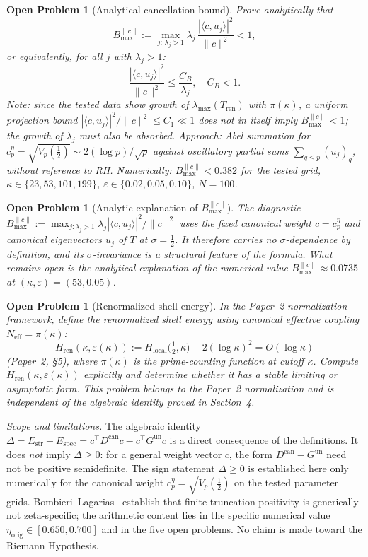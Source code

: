 \documentclass[11pt]{article}
\newtheorem{openproblem}[theorem]{Open Problem}
\newcommand{\etaorig}{\eta_{\mathrm{orig}}}
\newcommand{\Tren}{T_{\mathrm{ren}}}
\begin{document}
\begin{openproblem}[Analytical cancellation bound]\label{op:cancel}
Prove analytically that
\[
B^{\|c\|}_{\max} :=
\max_{j:\,\lambda_j>1}\lambda_j\,
\frac{|\langle c,u_j\rangle|^2}{\|c\|^2} < 1,
\]
or equivalently, for all $j$ with $\lambda_j>1$:
\[
\frac{|\langle c,u_j\rangle|^2}{\|c\|^2}\leq\frac{C_B}{\lambda_j},\quad C_B<1.
\]
Note: since the tested data show growth of $\lambda_{\max}(\Tren)$
with $\pi(\kappa)$,
a uniform projection bound $|\langle c,u_j\rangle|^2/\|c\|^2\leq C_1\ll 1$
does not in itself imply $B^{\|c\|}_{\max}<1$; the growth of $\lambda_j$
must also be absorbed.
Approach: Abel summation for $c_p^\eta=\sqrt{V_p(\tfrac12)}\sim 2(\log p)/\!\sqrt{p}$
against oscillatory partial sums $\sum_{q\leq p}(u_j)_q$, without reference to RH.
Numerically: $B^{\|c\|}_{\max}<0.382$ for the tested grid,
$\kappa\in\{23,53,101,199\}$, $\varepsilon\in\{0.02,0.05,0.10\}$, $N=100$.
\end{openproblem}

\begin{openproblem}[Analytic explanation of $B^{\|c\|}_{\max}$]\label{op:sigma}
The diagnostic $B^{\|c\|}_{\max}:=\max_{j:\lambda_j>1}\lambda_j|\langle c,u_j\rangle|^2/\|c\|^2$
uses the fixed canonical weight $c=c_p^\eta$ and canonical eigenvectors $u_j$
of $T$ at $\sigma=\tfrac12$. It therefore carries no $\sigma$-dependence by
definition, and its $\sigma$-invariance is a structural feature of the formula.
What remains open is the analytical explanation of the numerical value
$B^{\|c\|}_{\max}\approx0.0735$ at $(\kappa,\varepsilon)=(53,0.05)$.
\end{openproblem}


\begin{openproblem}[Renormalized shell energy]\label{op:shell}
In the Paper~2 normalization framework, define the renormalized shell energy
using canonical effective coupling $N_{\mathrm{eff}}=\pi(\kappa)$:
\[
H_{\mathrm{ren}}(\kappa,\varepsilon(\kappa))
:= H_{\mathrm{local}}\!\bigl(\tfrac12,\kappa\bigr) - 2(\log\kappa)^2
= O(\log\kappa)
\]
(Paper~2, \S5), where $\pi(\kappa)$ is the prime-counting function
at cutoff $\kappa$.
Compute $H_{\mathrm{ren}}(\kappa,\varepsilon(\kappa))$ explicitly and
determine whether it has a stable limiting or asymptotic form.
This problem belongs to the Paper~2 normalization and is independent of
the algebraic identity proved in Section~4.
\end{openproblem}

\medskip
\emph{Scope and limitations.}
The algebraic identity
$\Delta = E_{\mathrm{str}} - E_{\mathrm{spec}}
= c^\top D^{\mathrm{can}}c - c^\top G^{\mathrm{un}}c$
is a direct consequence of the definitions. It does \emph{not}
imply $\Delta\ge0$: for a general weight vector $c$, the form
$D^{\mathrm{can}}-G^{\mathrm{un}}$ need not be positive
semidefinite. The sign statement $\Delta\ge0$ is established
here only numerically for the canonical weight
$c_p^\eta=\sqrt{V_p(\tfrac12)}$ on the tested parameter grids.
Bombieri--Lagarias~\cite{BombieriLagarias99} establish that
finite-truncation positivity is generically not zeta-specific;
the arithmetic content lies in the specific numerical value
$\etaorig\in[0.650,0.700]$ and in the five open problems.
No claim is made toward the Riemann Hypothesis.
\end{document}
